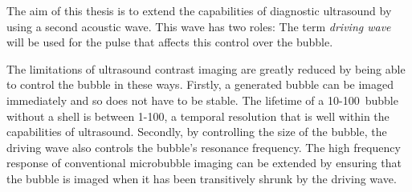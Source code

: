 The aim of this thesis is to extend the capabilities of diagnostic ultrasound
by using a second acoustic wave.
This wave has two roles:
The term {\em driving wave} will be used for the pulse that affects this control over the bubble.

The limitations of ultrasound contrast imaging are greatly reduced
by being able to control the bubble in these ways.
Firstly, a generated bubble can be imaged immediately and so does not have to be stable.  
The lifetime of  a 10-\unit{100}\nano\metre\ bubble without a shell is between 1-\unit{100}\micro\second\cite{Ljunggren1997}, 
a temporal resolution that is well within the capabilities of ultrasound.
Secondly, by controlling the size of the bubble, 
the driving wave also controls the bubble's resonance frequency.
The high frequency response of conventional microbubble imaging 
can be extended by ensuring that the bubble is imaged 
when it has been transitively shrunk by the driving wave.



